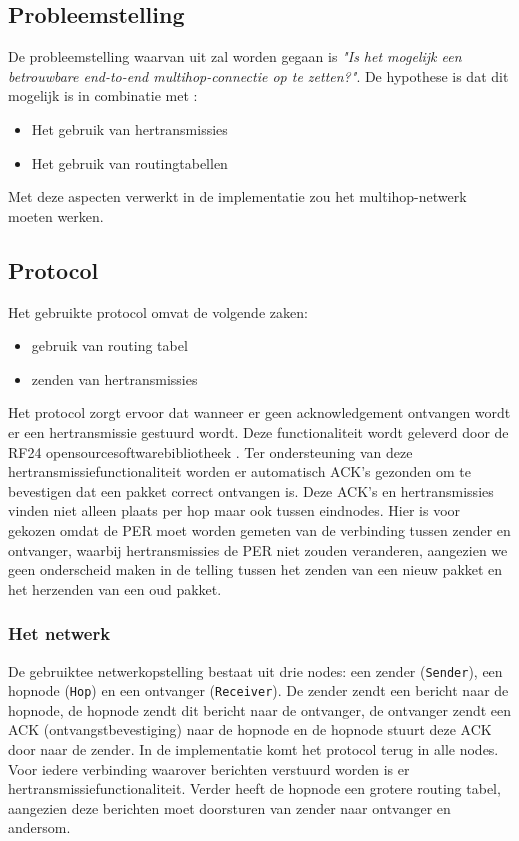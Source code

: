 \documentclass{article}
\begin{document}
\subsection{Probleemstelling}

De probleemstelling waarvan uit zal worden gegaan is \textit{"Is het mogelijk een betrouwbare end-to-end multihop-connectie op te zetten?"}. De hypothese is dat dit mogelijk is in combinatie met :
\begin{itemize}
	\item Het gebruik van hertransmissies
	\item Het gebruik van routingtabellen
\end{itemize}
Met deze aspecten verwerkt in de implementatie zou het multihop-netwerk moeten werken. 
\subsection{Protocol}
Het gebruikte protocol omvat de volgende zaken:
\begin{itemize}
	\item gebruik van routing tabel
	\item zenden van hertransmissies
\end{itemize}
Het protocol zorgt ervoor dat wanneer er geen acknowledgement ontvangen wordt er een hertransmissie gestuurd wordt. Deze functionaliteit wordt geleverd door de RF24 opensourcesoftwarebibliotheek \cite{rf24}. Ter ondersteuning van deze hertransmissiefunctionaliteit worden er automatisch ACK's gezonden om te bevestigen dat een pakket correct ontvangen is. Deze ACK's en hertransmissies vinden niet alleen plaats per hop maar ook tussen eindnodes. Hier is voor gekozen omdat de PER moet worden gemeten van de verbinding tussen zender en ontvanger, waarbij hertransmissies de PER niet zouden veranderen, aangezien we geen onderscheid maken in de telling tussen het zenden van een nieuw pakket en het herzenden van een oud pakket.



\subsubsection{Het netwerk}
De gebruiktee netwerkopstelling bestaat uit drie nodes: een zender (\texttt{Sender}), een hopnode (\texttt{Hop}) en een ontvanger (\texttt{Receiver}). De zender zendt een bericht naar de hopnode, de hopnode zendt dit bericht naar de ontvanger, de ontvanger zendt een ACK (ontvangstbevestiging) naar de hopnode en de hopnode stuurt deze ACK door naar de zender.  In de implementatie komt het protocol terug in alle nodes. Voor iedere verbinding waarover berichten verstuurd worden is er hertransmissiefunctionaliteit. Verder heeft de hopnode een grotere routing tabel, aangezien deze berichten moet doorsturen van zender naar ontvanger en andersom.
\end{document}
